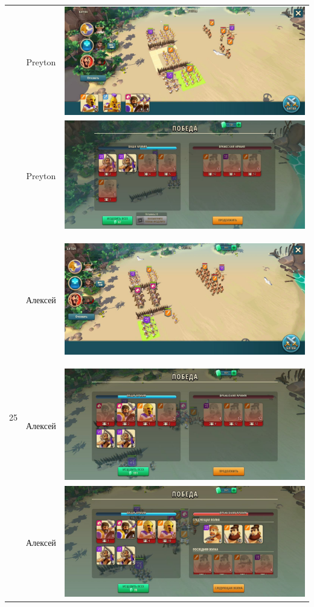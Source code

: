 \begin{longtable}{|c|c|c|}
	& Preyton &
	\includegraphics[width=0.75\linewidth]{./parts/media/TreasureHunt/25/Preyton/25.1.jpg} \\
	& Preyton &
	\includegraphics[width=0.75\linewidth]{./parts/media/TreasureHunt/25/Preyton/25_2.jpg} \\
	\hline
	\multirow{14}{*}{25} & Алексей &
	\hypertarget{fight25}{\includegraphics[width=0.75\linewidth]{./parts/media/TreasureHunt/25/alexey/photo_2022-04-07_10-09-19.jpg}} \\
	& Алексей &
	\includegraphics[width=0.75\linewidth]{./parts/media/TreasureHunt/25/alexey/photo_2022-04-07_10-09-24.jpg} \\
	& Алексей &
	\includegraphics[width=0.75\linewidth]{./parts/media/TreasureHunt/25/alexey/photo_2022-04-07_10-09-08.jpg} \\

\end{longtable}
